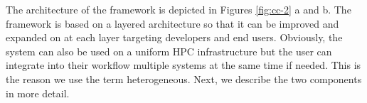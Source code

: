 \documentclass[utf8]{FrontiersinVancouver} %
\begin{document}
The architecture of the framework is depicted in Figures \ref{fig:cc-2} a and b. 
The framework is based on a layered architecture so that
it can be improved and expanded on at each layer targeting
developers and end users.
Obviously, the system can also be used on a uniform HPC infrastructure but the user can integrate into their workflow multiple systems at the same time if needed. This is the reason we use the term heterogeneous. Next, we describe the two components in more detail.

\begin{figure}[htb]

\end{figure}
\end{document}
